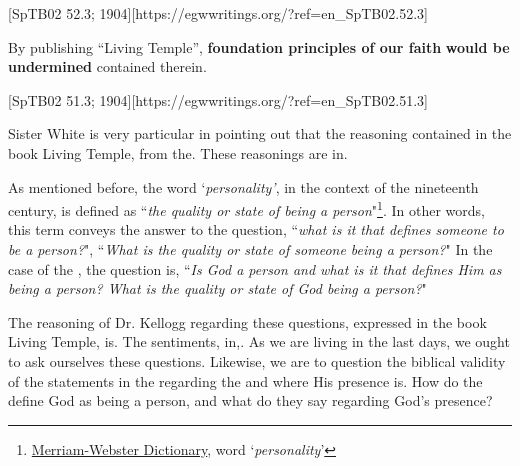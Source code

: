 [SpTB02 52.3; 1904][https://egwwritings.org/?ref=en\_SpTB02.52.3]

By publishing “Living Temple”, \textbf{foundation principles of our faith} \textbf{would be undermined} contained therein. 

[SpTB02 51.3; 1904][https://egwwritings.org/?ref=en\_SpTB02.51.3]

Sister White is very particular in pointing out that the reasoning contained in the book Living Temple, from the. These reasonings are in.

As mentioned before, the word ‘\textit{personality’}, in the context of the nineteenth century, is defined as “\textit{the quality or state of being a person}"\footnote{\href{https://www.merriam-webster.com/dictionary/personality}{Merriam-Webster Dictionary}, word ‘\textit{personality}’}. In other words, this term conveys the answer to the question, “\textit{what is it that defines someone to be a person?}", “\textit{What is the quality or state of someone being a person?}" In the case of the , the question is, “\textit{Is God a person and what is it that defines Him as being a person? What is the quality or state of God being a person?}"

The reasoning of Dr. Kellogg regarding these questions, expressed in the book Living Temple, is. The sentiments, in,. As we are living in the last days, we ought to ask ourselves these questions. Likewise, we are to question the biblical validity of the statements in the  regarding the  and where His presence is. How do the  define God as being a person, and what do they say regarding God’s presence?

